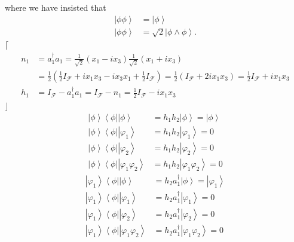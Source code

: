 \documentclass[aps,preprint]{revtex4}%
\begin{document}
where we have insisted that
\begin{align}
\left\vert \phi\phi\right\rangle  &  =\left\vert \phi\right\rangle \\
\left\vert \phi\phi\right\rangle  &  =\sqrt{2}\left\vert \phi\wedge
\phi\right\rangle .
\end{align}
$\lceil$%
\begin{align}
n_{1} &  =a_{1}^{\dagger}a_{1}=\frac{1}{\sqrt{2}}\left(  x_{1}-ix_{3}\right)
\frac{1}{\sqrt{2}}\left(  x_{1}+ix_{3}\right)  \\
&  =\frac{1}{2}\left(  \frac{1}{2}I_{\mathcal{F}}+ix_{1}x_{3}-ix_{3}%
x_{1}+\frac{1}{2}I_{\mathcal{F}}\right)  =\frac{1}{2}\left(  I_{\mathcal{F}%
}+2ix_{1}x_{3}\right)  =\frac{1}{2}I_{\mathcal{F}}+ix_{1}x_{3}\\
h_{1} &  =I_{\mathcal{F}}-a_{1}^{\dagger}a_{1}=I_{\mathcal{F}}-n_{1}=\frac
{1}{2}I_{\mathcal{F}}-ix_{1}x_{3}%
\end{align}
$\rfloor$%
\begin{align}
\left\vert \phi\right\rangle \left\langle \phi\right\vert \left\vert
\phi\right\rangle  &  =h_{1}h_{2}\left\vert \phi\right\rangle =\left\vert
\phi\right\rangle \\
\left\vert \phi\right\rangle \left\langle \phi\right\vert \left\vert
\varphi_{1}\right\rangle  &  =h_{1}h_{2}\left\vert \varphi_{1}\right\rangle
=0\\
\left\vert \phi\right\rangle \left\langle \phi\right\vert \left\vert
\varphi_{2}\right\rangle  &  =h_{1}h_{2}\left\vert \varphi_{2}\right\rangle
=0\\
\left\vert \phi\right\rangle \left\langle \phi\right\vert \left\vert
\varphi_{1}\varphi_{2}\right\rangle  &  =h_{1}h_{2}\left\vert \varphi
_{1}\varphi_{2}\right\rangle =0
\end{align}%
\begin{align}
\left\vert \varphi_{1}\right\rangle \left\langle \phi\right\vert \left\vert
\phi\right\rangle  &  =h_{2}a_{1}^{\dagger}\left\vert \phi\right\rangle
=\left\vert \varphi_{1}\right\rangle \\
\left\vert \varphi_{1}\right\rangle \left\langle \phi\right\vert \left\vert
\varphi_{1}\right\rangle  &  =h_{2}a_{1}^{\dagger}\left\vert \varphi
_{1}\right\rangle =0\\
\left\vert \varphi_{1}\right\rangle \left\langle \phi\right\vert \left\vert
\varphi_{2}\right\rangle  &  =h_{2}a_{1}^{\dagger}\left\vert \varphi
_{2}\right\rangle =0\\
\left\vert \varphi_{1}\right\rangle \left\langle \phi\right\vert \left\vert
\varphi_{1}\varphi_{2}\right\rangle  &  =h_{2}a_{1}^{\dagger}\left\vert
\varphi_{1}\varphi_{2}\right\rangle =0
\end{align}%
\end{document}
